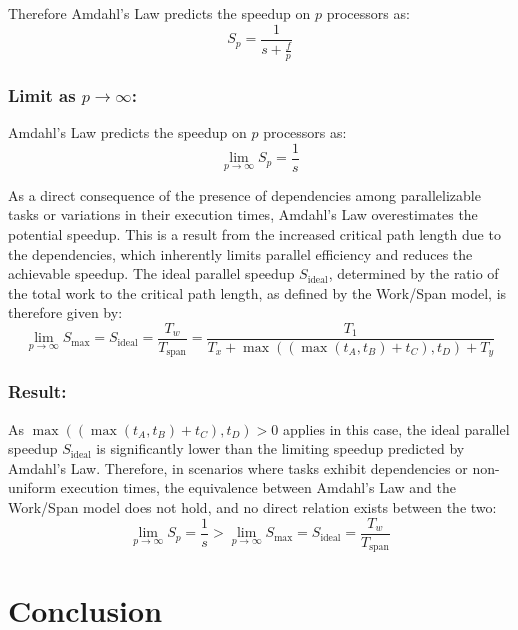 \documentclass[
  a4paper, %
]{kaohandt}
\begin{document}
Therefore Amdahl's Law predicts the speedup on $p$ processors as:
\begin{equation}
  S_p = \frac{1}{s + \frac{f}{p}}
\end{equation}

\subsubsection*{Limit as $p \rightarrow \infty$:}
Amdahl's Law predicts the speedup on $p$ processors as:
\begin{equation}
  \lim_{p \to \infty} S_p = \frac{1}{s}
\end{equation}

As a direct consequence of the presence of dependencies among parallelizable tasks or variations in their execution times, Amdahl's Law overestimates the potential speedup. This is a result from the increased critical path length due to the dependencies, which inherently limits parallel efficiency and reduces the achievable speedup. The ideal parallel speedup $S_{\text{ideal}}$, determined by the ratio of the total work to the critical path length, as defined by the Work/Span model, is therefore given by:
\begin{equation}
  \lim_{p \to \infty} S_{\text{max}} = S_{\text{ideal}} = \frac{T_w}{T_{\text{span}}} = \frac{T_1}{T_x + \max((\max(t_A, t_B) + t_C), t_D) + T_y}
\end{equation}

\subsubsection*{Result:}

As $\max((\max(t_A, t_B) + t_C), t_D) > 0$ applies in this case, the ideal parallel speedup $S_{\text{ideal}}$ is significantly lower than the limiting speedup predicted by Amdahl's Law. Therefore, in scenarios where tasks exhibit dependencies or non-uniform execution times, the equivalence between Amdahl's Law and the Work/Span model does not hold, and no direct relation exists between the two:
\begin{equation}
  \lim_{p \to \infty} S_p = \frac{1}{s} > \lim_{p \to \infty} S_{\text{max}} = S_{\text{ideal}} = \frac{T_w}{T_{\text{span}}}
\end{equation}

\section{Conclusion}
\end{document}
